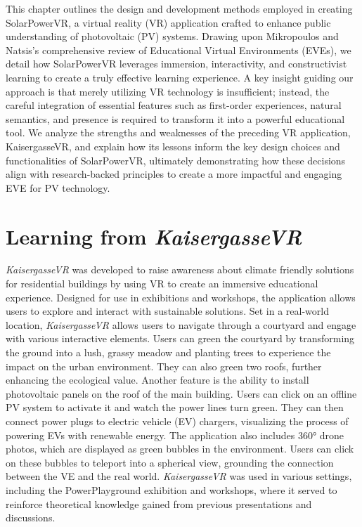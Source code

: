 \documentclass[draft, final]{vutinfth} %
\begin{document}
This chapter outlines the design and development methods employed in creating SolarPowerVR, a virtual reality (VR) application crafted to enhance public understanding of photovoltaic (PV) systems. Drawing upon Mikropoulos and Natsis's \cite{Mikropoulos2011VrEducational} comprehensive review of Educational Virtual Environments (EVEs), we detail how SolarPowerVR leverages immersion, interactivity, and constructivist learning to create a truly effective learning experience. A key insight guiding our approach is that merely utilizing VR technology is insufficient; instead, the careful integration of essential features such as first-order experiences, natural semantics, and presence is required to transform it into a powerful educational tool. We analyze the strengths and weaknesses of the preceding VR application, KaisergasseVR, and explain how its lessons inform the key design choices and functionalities of SolarPowerVR, ultimately demonstrating how these decisions align with research-backed principles to create a more impactful and engaging EVE for PV technology.

\section{Learning from \textit{KaisergasseVR}}

\textit{KaisergasseVR} was developed to raise awareness about climate friendly solutions for residential buildings by using VR to create an immersive educational experience. Designed for use in exhibitions and workshops, the application allows users to explore and interact with sustainable solutions. Set in a real-world location, \textit{KaisergasseVR} allows users to navigate through a courtyard and engage with various interactive elements. Users can green the courtyard by transforming the ground into a lush, grassy meadow and planting trees to experience the impact on the urban environment. They can also green two roofs, further enhancing the ecological value. Another feature is the ability to install photovoltaic panels on the roof of the main building. Users can click on an offline PV system to activate it and watch the power lines turn green. They can then connect power plugs to electric vehicle (EV) chargers, visualizing the process of powering EVs with renewable energy. The application also includes 360° drone photos, which are displayed as green bubbles in the environment. Users can click on these bubbles to teleport into a spherical view, grounding the connection between the VE and the real world. \textit{KaisergasseVR} was used in various settings, including the PowerPlayground exhibition and workshops, where it served to reinforce theoretical knowledge gained from previous presentations and discussions.
\end{document}
